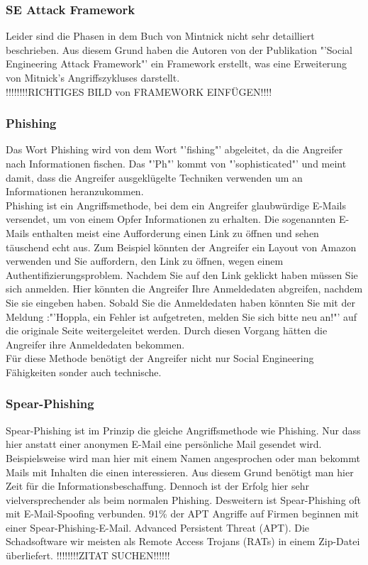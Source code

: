 \subsubsection{SE Attack Framework}
Leider sind die Phasen in dem Buch von Mintnick \cite{ArtOfDeception} nicht sehr detailliert beschrieben. Aus diesem Grund haben die Autoren von der Publikation "'Social Engineering Attack Framework"' \cite{AttackFramework} ein Framework erstellt, was eine Erweiterung von Mitnick's Angriffszykluses darstellt.\\

!!!!!!!!RICHTIGES BILD von FRAMEWORK EINFÜGEN!!!!\\

\subsubsection{Phishing}
Das Wort Phishing wird von dem Wort "'fishing"' abgeleitet, da die Angreifer nach Informationen fischen. Das "'Ph"' kommt von "'sophisticated"' und meint damit, dass die Angreifer ausgeklügelte Techniken verwenden um an Informationen heranzukommen.\cite{PhishingExposed}\\
Phishing ist ein Angriffsmethode, bei dem ein Angreifer glaubwürdige E-Mails versendet, um von einem Opfer Informationen zu erhalten. Die sogenannten E-Mails enthalten meist eine Aufforderung einen Link zu öffnen und sehen täuschend echt aus. Zum Beispiel könnten der Angreifer ein Layout von Amazon verwenden und Sie auffordern, den Link zu öffnen, wegen einem Authentifizierungsproblem. Nachdem Sie auf den Link geklickt haben müssen Sie sich anmelden. Hier könnten die Angreifer Ihre Anmeldedaten abgreifen, nachdem Sie sie eingeben haben. Sobald Sie die Anmeldedaten haben könnten Sie mit der Meldung :"'Hoppla, ein Fehler ist aufgetreten, melden Sie sich bitte neu an!"' auf die originale Seite weitergeleitet werden. Durch diesen Vorgang hätten die Angreifer ihre Anmeldedaten bekommen.\\
Für diese Methode benötigt der Angreifer nicht nur Social Engineering Fähigkeiten sonder auch technische.\cite{PhishingDarkWaters}

\subsubsection{Spear-Phishing}
Spear-Phishing ist im Prinzip die gleiche Angriffsmethode wie Phishing. Nur dass hier anstatt einer anonymen E-Mail eine persönliche Mail gesendet wird. Beispielsweise wird man hier mit einem Namen angesprochen oder man bekommt Mails mit Inhalten die einen interessieren. Aus diesem Grund benötigt man hier Zeit für die Informationsbeschaffung. Dennoch ist der Erfolg hier sehr vielversprechender als beim normalen Phishing. Desweitern ist Spear-Phishing oft mit E-Mail-Spoofing verbunden.
91\% der APT Angriffe auf Firmen beginnen mit einer Spear-Phishing-E-Mail. Advanced Persistent Threat (APT). Die Schadsoftware wir meisten als Remote Access Trojans (RATs) in einem Zip-Datei überliefert.
!!!!!!!!ZITAT SUCHEN!!!!!!

